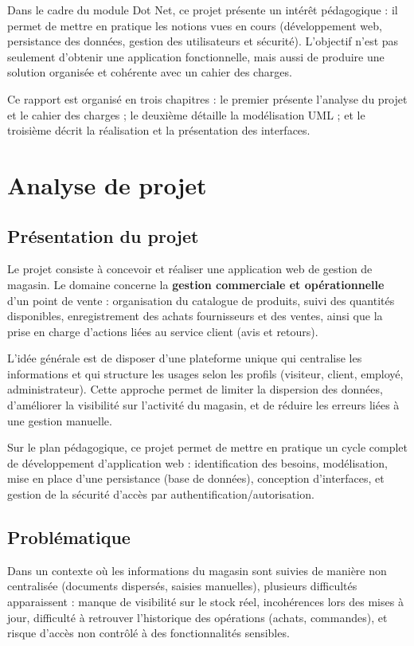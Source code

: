 \documentclass[12pt,a4paper]{report}
\begin{document}
Dans le cadre du module Dot Net, ce projet présente un intérêt pédagogique : il permet de mettre en pratique les notions vues en cours (développement web, persistance des données, gestion des utilisateurs et sécurité). L’objectif n’est pas seulement d’obtenir une application fonctionnelle, mais aussi de produire une solution organisée et cohérente avec un cahier des charges.

Ce rapport est organisé en trois chapitres : le premier présente l’analyse du projet et le cahier des charges ; le deuxième détaille la modélisation UML ; et le troisième décrit la réalisation et la présentation des interfaces.

\chapter{Analyse de projet}

\section{Présentation du projet}
Le projet consiste à concevoir et réaliser une application web de gestion de magasin. Le domaine concerne la \textbf{gestion commerciale et opérationnelle} d’un point de vente : organisation du catalogue de produits, suivi des quantités disponibles, enregistrement des achats fournisseurs et des ventes, ainsi que la prise en charge d’actions liées au service client (avis et retours).

L’idée générale est de disposer d’une plateforme unique qui centralise les informations et qui structure les usages selon les profils (visiteur, client, employé, administrateur). Cette approche permet de limiter la dispersion des données, d’améliorer la visibilité sur l’activité du magasin, et de réduire les erreurs liées à une gestion manuelle.

Sur le plan pédagogique, ce projet permet de mettre en pratique un cycle complet de développement d’application web : identification des besoins, modélisation, mise en place d’une persistance (base de données), conception d’interfaces, et gestion de la sécurité d’accès par authentification/autorisation.

\section{Problématique}
Dans un contexte où les informations du magasin sont suivies de manière non centralisée (documents dispersés, saisies manuelles), plusieurs difficultés apparaissent : manque de visibilité sur le stock réel, incohérences lors des mises à jour, difficulté à retrouver l’historique des opérations (achats, commandes), et risque d’accès non contrôlé à des fonctionnalités sensibles.
\end{document}
